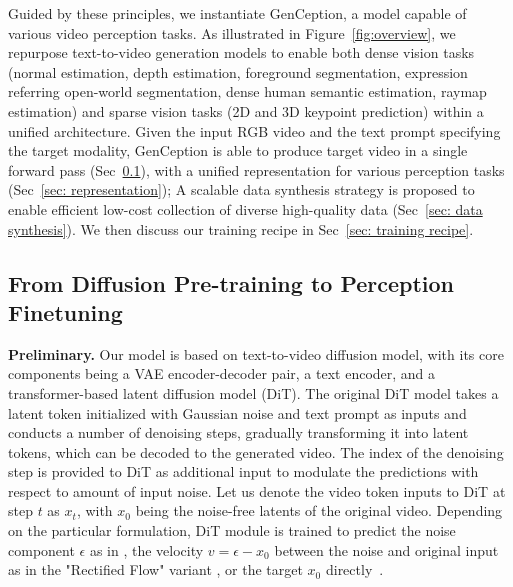 \documentclass[11pt, a4paper, logo, onecolumn]{googledeepmind}
\newcommand{\ModelName}{GenCeption\xspace}
\begin{document}
Guided by these principles, we instantiate {\ModelName}, a model capable of various video perception tasks. As illustrated in Figure~\ref{fig:overview}, we repurpose text-to-video generation models to enable both dense vision tasks (normal estimation, depth estimation, foreground segmentation, expression referring open-world segmentation, dense human semantic estimation, raymap estimation) and sparse vision tasks (2D and 3D keypoint prediction) within a unified architecture. 
Given the input RGB video and the text prompt specifying the target modality, \ModelName is able to produce target video in a single forward pass (Sec~\ref{sec: architecture}), with a unified representation for various perception tasks (Sec~\ref{sec: representation});
A scalable data synthesis strategy is proposed to enable efficient low-cost collection of diverse high-quality data (Sec~\ref{sec: data synthesis}).
We then discuss our training recipe in Sec~\ref{sec: training recipe}.







\subsection{From Diffusion Pre-training to Perception Finetuning}
\label{sec: architecture}

{\textbf{{Preliminary}.}}
Our model is based on text-to-video diffusion model, with its core components being a VAE encoder-decoder pair, a text encoder, and a transformer-based latent diffusion model (DiT). 
The original DiT model takes a latent token initialized with Gaussian noise and text prompt as inputs and conducts a number of denoising steps, gradually transforming it into latent tokens, which can be decoded to the generated video. The index of the denoising step is provided to DiT as additional input to modulate the predictions with respect to amount of input noise. Let us denote the video token inputs to DiT at step $t$ as $x_t$, with $x_0$ being the noise-free latents of the original video. Depending on the particular formulation, DiT module is trained to predict the noise component $\epsilon$ as in \cite{song2020denoising,ho2020denoisingdiffusionprobabilisticmodels}, the velocity $v = \epsilon - x_0$ between the noise and original input as in the "Rectified Flow" variant \cite{liu2022flow, lipman2022flow, esser2024scaling}, or the target $x_0$ directly~\cite{li2026back}.
\end{document}
